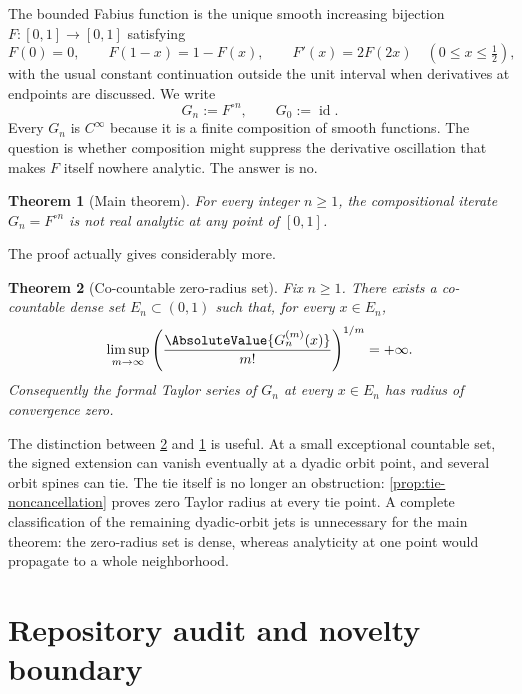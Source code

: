 \documentclass[11pt,oneside]{article}
\newtheorem{theorem}{Theorem}[section]
\theoremstyle{definition}
\theoremstyle{remark}
\newcommand{\id}{\operatorname{id}}
\newcommand{\comp}{\mathbin{\circ}}
\newcommand{\half}{\tfrac12}
\begin{document}
The bounded Fabius function is the unique smooth increasing bijection
$F\colon[0,1]\to[0,1]$ satisfying
\begin{equation}
  F(0)=0,\qquad F(1-x)=1-F(x),\qquad F'(x)=2F(2x)
  \quad(0\leq x\leq\half),
  \label{eq:basic-F}
\end{equation}
with the usual constant continuation outside the unit interval when derivatives at
endpoints are discussed.  We write
\[
  G_n:=F^{\comp n},\qquad G_0:=\id.
\]
Every $G_n$ is $C^\infty$ because it is a finite composition of smooth functions.
The question is whether composition might suppress the derivative oscillation that
makes $F$ itself nowhere analytic.  The answer is no.

\begin{theorem}[Main theorem]
\label{thm:main}
For every integer $n\geq1$, the compositional iterate $G_n=F^{\comp n}$ is not real
analytic at any point of $[0,1]$.
\end{theorem}

The proof actually gives considerably more.

\begin{theorem}[Co-countable zero-radius set]
\label{thm:strong}
Fix $n\geq1$.  There exists a co-countable dense set $E_n\subset(0,1)$ such that, for
every $x\in E_n$,
\begin{equation}
 \limsup_{m\to\infty}
 \left(\frac{\AbsoluteValue{G_n^{(m)}(x)}}{m!}\right)^{1/m}=+\infty.
 \label{eq:infinite-limsup}
\end{equation}
Consequently the formal Taylor series of $G_n$ at every $x\in E_n$ has radius of
convergence zero.
\end{theorem}

The distinction between \cref{thm:strong} and \cref{thm:main} is useful.  At a small
exceptional countable set, the signed extension can vanish eventually at a dyadic
orbit point, and several orbit spines can tie.  The tie itself is no longer an
obstruction: \cref{prop:tie-noncancellation} proves zero Taylor radius at every tie
point.  A complete classification of the remaining dyadic-orbit jets is unnecessary
for the main theorem: the zero-radius set is dense, whereas analyticity at one point
would propagate to a whole neighborhood.

\section{Repository audit and novelty boundary}
\label{sec:audit}
\end{document}
